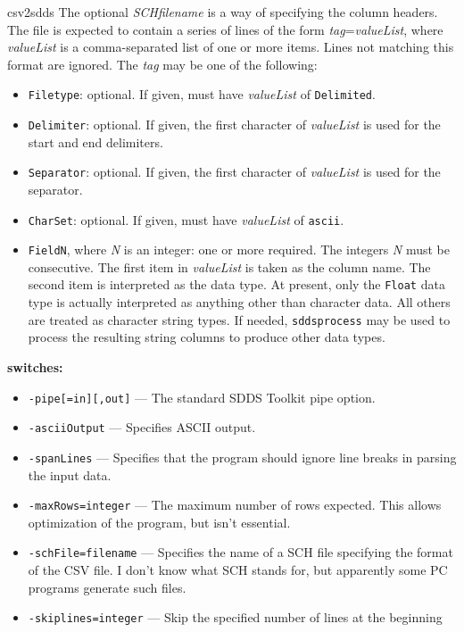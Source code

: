 \begin{sddsprog}{csv2sdds}
    The optional {\em SCHfilename} is a way of specifying the column headers. The file is
    expected to contain a series of lines of the form {\em tag}={\em valueList}, where {\em
    valueList} is a comma-separated list of one or more items. Lines not matching this format are
    ignored. The {\em tag} may be one of the following:
    \begin{itemize}
      \item \verb|Filetype|: optional. If given, must have {\em valueList} of \verb|Delimited|.
      \item \verb|Delimiter|: optional. If given, the first character of {\em valueList} is used for
        the start and end delimiters.
      \item \verb|Separator|: optional. If given, the first character of {\em valueList} is used for
        the separator.
      \item \verb|CharSet|: optional. If given, must have {\em valueList} of \verb|ascii|.
      \item \verb|FieldN|, where {\em N} is an integer: one or more required. The integers {\em N}
        must be consecutive. The first item in {\em valueList} is taken as the column name.
        The second item is interpreted as the data type. At present, only the \verb|Float| data type is actually
        interpreted as anything other than character data. All others are
        treated as character string types. If needed, \verb|sddsprocess| may be used to process the
        resulting string columns to produce other data types.
    \end{itemize}
  \item \textbf{switches:}
    \begin{itemize}
      \item \verb|-pipe[=in][,out]| --- The standard SDDS Toolkit pipe option.
      \item \verb|-asciiOutput| --- Specifies ASCII output.
      \item \verb|-spanLines| --- Specifies that the program should ignore line breaks in parsing the
        input data.
      \item \verb|-maxRows=integer| --- The maximum number of rows expected. This allows
        optimization of the program, but isn't essential.
      \item \verb|-schFile=filename| --- Specifies the name of a SCH file specifying the
        format of the CSV file. I don't know what SCH stands for, but apparently some PC
        programs generate such files.
      \item \verb|-skiplines=integer| --- Skip the specified number of lines at the beginning

\end{itemize}
\end{sddsprog}
